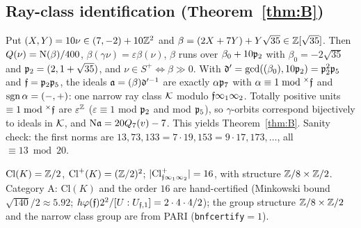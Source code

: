 \subsection{Ray-class identification (Theorem~\ref{thm:B})}\label{sec:rayclass}
Put $(X,Y)=10\nu\in(7,-2)+10\mathbb{Z}^2$ and $\beta=(2X+7Y)+Y\sqrt{35}\in\mathbb{Z}[\sqrt{35}]$. Then $Q(\nu)=\mathrm{N}(\beta)/400$,
$\beta(\gamma\nu)=\varepsilon\beta(\nu)$, $\beta$ runs over $\beta_0+10\mathfrak{p}_2$ with $\beta_0=-2\sqrt{35}$ and
$\mathfrak{p}_2=(2,1+\sqrt{35})$, and $\nu\in S^+\Leftrightarrow\beta\gg0$. With $\mathfrak d'=\gcd((\beta_0),10\mathfrak{p}_2)=\mathfrak{p}_2^2\mathfrak{p}_5$ and
$\mathfrak{f}=\mathfrak{p}_2\mathfrak{p}_5$, the ideals $\mathfrak{a}=(\beta)\mathfrak d'^{-1}$ are exactly $\alpha\mathfrak{p}_7$ with $\alpha\equiv1\bmod^\times\mathfrak{f}$ and
$\operatorname{sgn}\alpha=(-,+)$: one narrow ray class $\mathcal{K}$ modulo $\mathfrak{f}\infty_1\infty_2$. Totally positive units $\equiv1\bmod^\times\mathfrak{f}$ are
$\varepsilon^{\mathbb{Z}}$ ($\varepsilon\equiv1$ mod $\mathfrak{p}_2$ and mod $\mathfrak{p}_5$), so $\gamma$-orbits correspond bijectively to ideals in $\mathcal{K}$, and
$\mathrm{N}\mathfrak{a}=20Q_7(v)-7$. This yields Theorem~\ref{thm:B}. Sanity check: the first norms are $13,73,133=7\cdot19,153=9\cdot17,173,\dots$, all
$\equiv13\bmod20$.

\begin{remark}
$\mathrm{Cl}(K)=\mathbb{Z}/2$, $\mathrm{Cl}^+(K)=(\mathbb{Z}/2)^2$; $|\mathrm{Cl}^+_{\mathfrak{f}\infty_1\infty_2}|=16$, with structure $\mathbb{Z}/8\times\mathbb{Z}/2$.
Category A: $\mathrm{Cl}(K)$ and the order $16$ are hand-certified (Minkowski bound $\sqrt{140}/2\approx5.92$; $h\varphi(\mathfrak{f})2^2/[U:U_{\mathfrak{f},1}]=2\cdot4\cdot4/2$); the group structure $\mathbb{Z}/8\times\mathbb{Z}/2$ and the narrow class group are from PARI (\texttt{bnfcertify}$=1$).
\end{remark}

